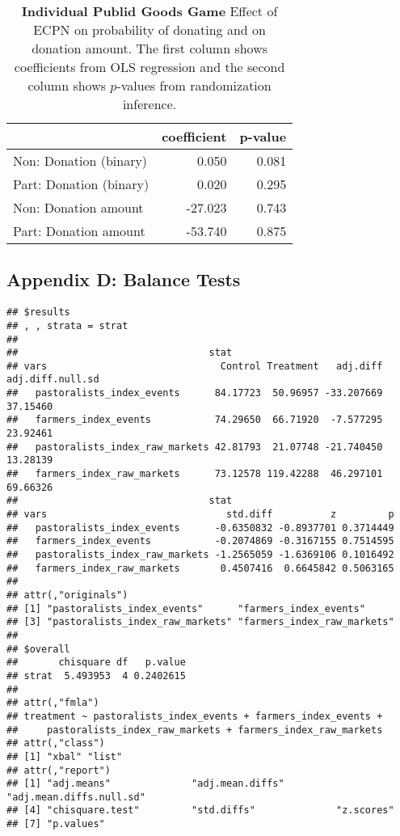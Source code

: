 \documentclass[
]{article}
\begin{document}
\begin{table}[H]
\begin{center}
\label{tab:pgg_tab_ind}
\caption{\textbf{Individual Publid Goods Game} Effect of ECPN on probability of donating and on donation amount. The first column shows coefficients from OLS regression and the second column shows $p$-values from randomization inference.}
\smallskip

\begin{tabular}{l|r|r}
\hline
  & coefficient & p-value\\
\hline
Non: Donation (binary) & 0.050 & 0.081\\
\hline
Part: Donation (binary) & 0.020 & 0.295\\
\hline
Non: Donation amount & -27.023 & 0.743\\
\hline
Part: Donation amount & -53.740 & 0.875\\
\hline
\end{tabular}


\end{center}
\end{table}

\hypertarget{appendix-d-balance-tests}{%
\subsection{Appendix D: Balance Tests}\label{appendix-d-balance-tests}}

\begin{verbatim}
## $results
## , , strata = strat
## 
##                                 stat
## vars                              Control Treatment   adj.diff adj.diff.null.sd
##   pastoralists_index_events      84.17723  50.96957 -33.207669         37.15460
##   farmers_index_events           74.29650  66.71920  -7.577295         23.92461
##   pastoralists_index_raw_markets 42.81793  21.07748 -21.740450         13.28139
##   farmers_index_raw_markets      73.12578 119.42288  46.297101         69.66326
##                                 stat
## vars                               std.diff          z         p
##   pastoralists_index_events      -0.6350832 -0.8937701 0.3714449
##   farmers_index_events           -0.2074869 -0.3167155 0.7514595
##   pastoralists_index_raw_markets -1.2565059 -1.6369106 0.1016492
##   farmers_index_raw_markets       0.4507416  0.6645842 0.5063165
## 
## attr(,"originals")
## [1] "pastoralists_index_events"      "farmers_index_events"          
## [3] "pastoralists_index_raw_markets" "farmers_index_raw_markets"     
## 
## $overall
##       chisquare df   p.value
## strat  5.493953  4 0.2402615
## 
## attr(,"fmla")
## treatment ~ pastoralists_index_events + farmers_index_events + 
##     pastoralists_index_raw_markets + farmers_index_raw_markets
## attr(,"class")
## [1] "xbal" "list"
## attr(,"report")
## [1] "adj.means"              "adj.mean.diffs"         "adj.mean.diffs.null.sd"
## [4] "chisquare.test"         "std.diffs"              "z.scores"              
## [7] "p.values"
\end{verbatim}
\end{document}
